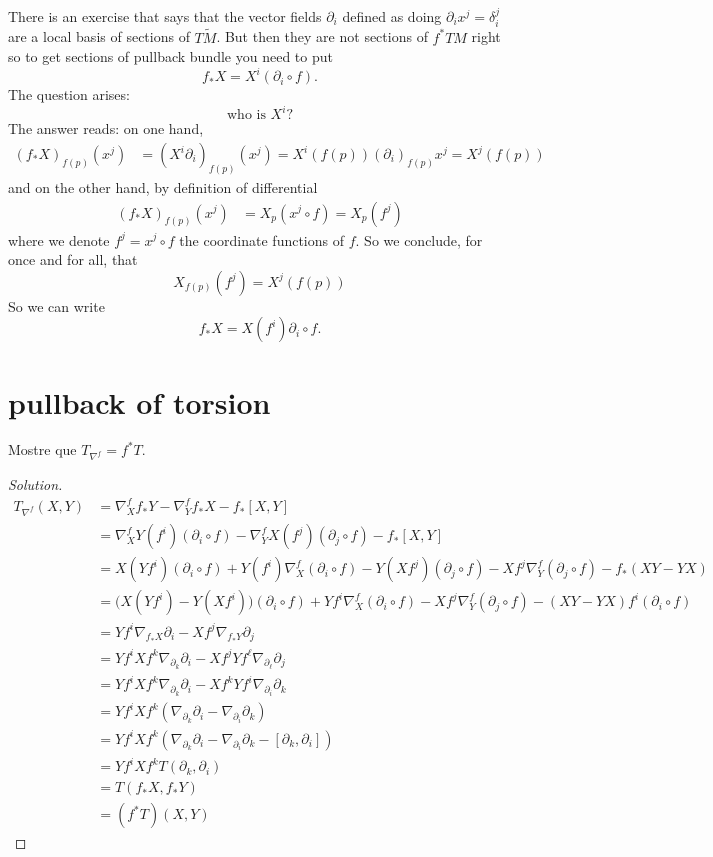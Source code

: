 There is an exercise that says that the vector fields \(\partial_i\) defined as doing \(\partial_i x^j=\delta_i^j\) are a local basis of sections of \(T\tilde{M}\). But then they are not sections of \(f^*TM\) right so to get sections of pullback bundle you need to put
\[f_* X=X^i(\partial_i \circ f).\]
The question arises:
\[\text{who is } X^i\text{?} \]
The answer reads: on one hand,
\begin{align*}
	(f_*X)_{f(p)}(x^j)&=(X^i \partial_i)_{f(p)}(x^j)=X^i(f(p))(\partial_i)_{f(p)}x^j=X^j(f(p))
\end{align*}
and on the other hand, by definition of differential
\begin{align*}
	(f_*X)_{f(p)}(x^j)&=X_p(x^j\circ f)=X_p(f^j)
\end{align*}
where we denote \(f^j=x^j \circ f\) the coordinate functions of \(f\). So we conclude, for once and for all, that
\[X_{f(p)}(f^j)=X^j(f(p))\]
So we can write
\[f_*X=X(f^i)\partial_i \circ f .\]

\section{pullback of torsion}

\begin{exercise}\leavevmode
Mostre que \(T_{\nabla^f}=f^*T\).
\end{exercise}

\begin{proof}[Solution]

\begin{align*}
	T_{\nabla^f}(X,Y)&=\nabla^f_X f_*Y-\nabla^f_Yf_*X-f_*[X,Y]\\
			 &=\nabla^f_XY(f^i)(\partial_i \circ f)-\nabla^f_YX(f^j)(\partial_j\circ f)-f_*[X,Y]\\
			 &=X(Yf^i)(\partial_i \circ f)+Y(f^i)\nabla^f_X(\partial_i \circ f)-Y(Xf^j)(\partial_j\circ f)-Xf^j \nabla^f_Y (\partial_j \circ f)-f_*(XY-YX)\\
			 &=\Big(X(Yf^i)-Y(Xf^i)\Big)(\partial_i \circ f)+Yf^i\nabla^f_X(\partial_i \circ f)-Xf^j\nabla^f_Y(\partial_j \circ f)-(XY-YX)f^i(\partial_i \circ f)\\
			 &=Yf^i \nabla_{f_*X}\partial_i-Xf^j \nabla_{f_*Y}\partial_j\\
&=Yf^iXf^k\nabla_{\partial_k}\partial_i-Xf^jYf^\ell \nabla_{\partial_\ell}\partial_j\\
&=Yf^iXf^k \nabla_{\partial_k}\partial_i-Xf^kYf^i \nabla_{\partial_i}\partial_k\\
&=Yf^iXf^k(\nabla_{\partial_k}\partial_i-\nabla_{\partial_i}\partial_k)\\
&=Yf^iXf^k(\nabla_{\partial_k}\partial_i-\nabla_{\partial_i}\partial_k-[\partial_k,\partial_i])\\
&=Yf^iXf^kT(\partial_k,\partial_i)\\
&=T(f_*X,f_*Y)\\
&=(f^*T)(X,Y)
\end{align*}
\end{proof}

